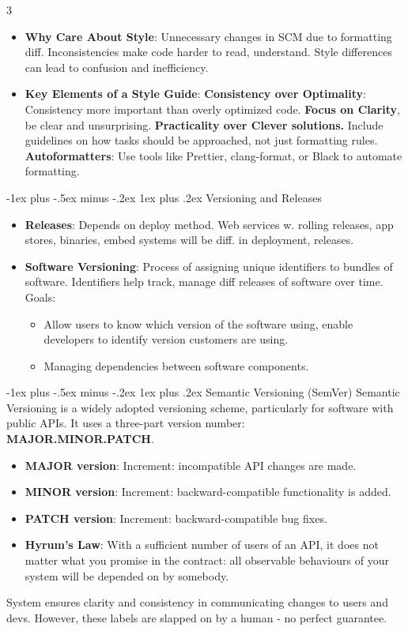 \documentclass[a4paper, 10pt, landscape]{article}
\makeatletter
\renewcommand{\subsubsection}{\@startsection{subsubsection}{3}{0mm}%
                                {-1ex plus -.5ex minus -.2ex}%
                                {1ex plus .2ex}%
                                {\normalfont\small\bfseries}}
\makeatother
\begin{document}
\begin{multicols*}{3}
\begin{itemize}
\item \textbf{Why Care About Style}: Unnecessary changes in SCM due to formatting diff. Inconsistencies make code harder to read, understand. Style differences can lead to confusion and inefficiency.
\item \textbf{Key Elements of a Style Guide}: \textbf{Consistency over Optimality}: Consistency more important than overly optimized code. \textbf{Focus on Clarity}, be clear and unsurprising. \textbf{Practicality over Clever solutions.} Include guidelines on how tasks should be approached, not just formatting rules. \textbf{Autoformatters}: Use tools like Prettier, clang-format, or Black to automate formatting.
\end{itemize}

\subsubsection{Versioning and Releases}
\begin{itemize}
\item \textbf{Releases}: Depends on deploy method. Web services w. rolling releases, app stores, binaries, embed systems will be diff. in deployment, releases.
\item \textbf{Software Versioning}: Process of assigning unique identifiers to bundles of software. Identifiers help track, manage diff releases of software over time. Goals: 
	\begin{itemize}[itemsep=-1pt]
	\item Allow users to know which version of the software using, enable developers to identify version customers are using. 
	\item Managing dependencies between software components.
	\end{itemize}
\end{itemize}

\subsubsection{Semantic Versioning (SemVer)}
Semantic Versioning is a widely adopted versioning scheme, particularly for software with public APIs. It uses a three-part version number: \\ \textbf{MAJOR.MINOR.PATCH}.
\begin{itemize}[itemsep=-1pt]
    \item \textbf{MAJOR version}: Increment: incompatible API changes are made.
    \item \textbf{MINOR version}: Increment: backward-compatible functionality is added.
    \item \textbf{PATCH version}: Increment: backward-compatible bug fixes.
    \item \textbf{Hyrum's Law}: With a sufficient number of users of an API, it does not matter what you promise in the contract: all observable behaviours of your system will be depended on by somebody. 
\end{itemize}
System ensures clarity and consistency in communicating changes to users and devs.  However, these labels are slapped on by a human - no perfect guarantee. 


\end{multicols*}
\end{document}

